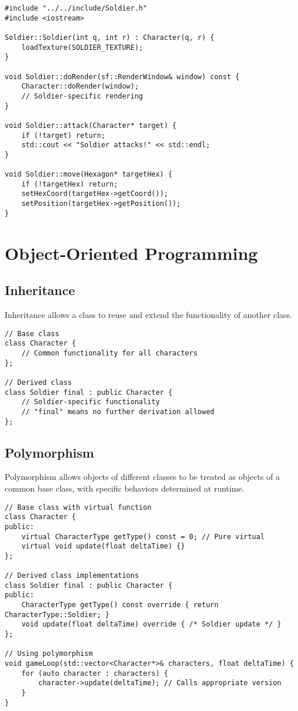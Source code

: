 \documentclass{article}
\begin{document}
\begin{lstlisting}[caption=Source File (Soldier.cpp)]
#include "../../include/Soldier.h"
#include <iostream>

Soldier::Soldier(int q, int r) : Character(q, r) {
    loadTexture(SOLDIER_TEXTURE);
}

void Soldier::doRender(sf::RenderWindow& window) const {
    Character::doRender(window);
    // Soldier-specific rendering
}

void Soldier::attack(Character* target) {
    if (!target) return;
    std::cout << "Soldier attacks!" << std::endl;
}

void Soldier::move(Hexagon* targetHex) {
    if (!targetHex) return;
    setHexCoord(targetHex->getCoord());
    setPosition(targetHex->getPosition());
}
\end{lstlisting}

\section{Object-Oriented Programming}

\subsection{Inheritance}

Inheritance allows a class to reuse and extend the functionality of another class.

\begin{lstlisting}[caption=Inheritance Example]
// Base class
class Character {
    // Common functionality for all characters
};

// Derived class
class Soldier final : public Character {
    // Soldier-specific functionality
    // "final" means no further derivation allowed
};
\end{lstlisting}

\subsection{Polymorphism}

Polymorphism allows objects of different classes to be treated as objects of a common base class, with specific behaviors determined at runtime.

\begin{lstlisting}[caption=Polymorphism Example]
// Base class with virtual function
class Character {
public:
    virtual CharacterType getType() const = 0; // Pure virtual
    virtual void update(float deltaTime) {}
};

// Derived class implementations
class Soldier final : public Character {
public:
    CharacterType getType() const override { return CharacterType::Soldier; }
    void update(float deltaTime) override { /* Soldier update */ }
};

// Using polymorphism
void gameLoop(std::vector<Character*>& characters, float deltaTime) {
    for (auto character : characters) {
        character->update(deltaTime); // Calls appropriate version
    }
}
\end{lstlisting}
\end{document}
